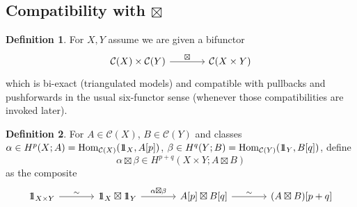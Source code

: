 \documentclass[10pt,a4paper,dvipsnames,x11names]{amsart}
\newcommand{\one}{1\hskip-3.5pt1}
\newcommand{\C}{\mathcal C}
\newcommand{\Hom}{\mathrm{Hom}}
\numberwithin{equation}{section}
\theoremstyle{plain}
\theoremstyle{definition}
\newtheorem{definition}[definition]{Definition}
\theoremstyle{remark}
\begin{document}
\subsection{Compatibility with \texorpdfstring{$\boxtimes$}{⊠}}

\begin{definition}\label{def:ext-prod-obj}
For $X,Y$ assume we are given a bifunctor
\begin{equation*}
\begin{tikzcd}[column sep=large]
\C(X)\times \C(Y) \arrow[r, "\boxtimes"] &
\C(X\times Y)
\end{tikzcd}
\end{equation*}
which is bi-exact (triangulated models) and compatible with pullbacks and pushforwards in the usual six-functor sense
(whenever those compatibilities are invoked later).
\end{definition}

\begin{definition}\label{def:ext-prod-coh}
For $A\in \C(X)$, $B\in \C(Y)$ and classes
$\alpha\in H^p(X;A)=\Hom_{\C(X)}(\one_X,A[p])$,
$\beta\in H^q(Y;B)=\Hom_{\C(Y)}(\one_Y,B[q])$,
define
$$
\alpha\boxtimes\beta\in H^{p+q}(X\times Y;A\boxtimes B)
$$
as the composite
\begin{equation*}
\begin{tikzcd}[column sep=large]
\one_{X\times Y}
\arrow[r, "\sim"] &
\one_X\boxtimes\one_Y
\arrow[r, "\alpha\boxtimes\beta"] &
A[p]\boxtimes B[q]
\arrow[r, "\sim"] &
(A\boxtimes B)[p+q]
\end{tikzcd}
\end{equation*}
\end{definition}
\end{document}
